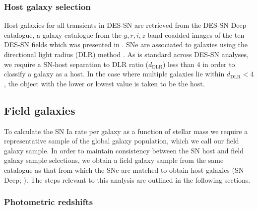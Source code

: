 \documentclass[fleqn,usenatbib]{mnras}
\begin{document}
\subsubsection{Host galaxy selection \label{subsubsec:sn_hosts}}
Host galaxies for all transients in DES-SN are retrieved from the DES-SN Deep catalogue, a galaxy catalogue from the $g, r, i, z$-band coadded images of the ten DES-SN fields which was presented in \citet{Wiseman2020}. SNe are associated to galaxies using the directional light radius (DLR) method \citep[e.g.][]{Sullivan2006,Gupta2016}. As is standard across DES-SN analyses, we require a SN-host separation to DLR ratio ($d_{\mathrm{DLR}}$) less than 4 in order to classify a galaxy as a host. In the case where multiple galaxies lie within $d_{\mathrm{DLR}}<4$, the object with the lower or lowest value is taken to be the host. 

\subsection{Field galaxies\label{subsec:field_sample}}

To calculate the SN Ia rate per galaxy as a function of stellar mass we require a representative sample of the global galaxy population, which we call our field galaxy sample. In order to maintain consistency between the SN host and field galaxy sample selections, we obtain a field galaxy sample from the same catalogue as that from which the SNe are matched to obtain host galaxies (SN Deep; \citealt{Wiseman2020}). The steps relevant to this analysis are outlined in the following sections.

\subsubsection{Photometric redshifts \label{subsubsec:photozs}}
\end{document}
